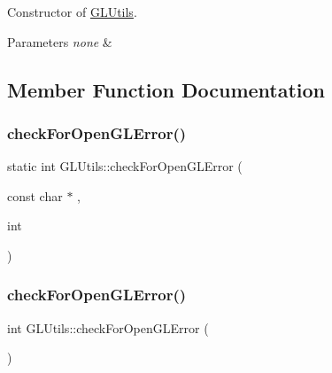 Constructor of \hyperlink{class_g_l_utils}{G\+L\+Utils}. 


\begin{DoxyParams}{Parameters}
{\em none} & \\
\hline
\end{DoxyParams}


\subsection{Member Function Documentation}
\hypertarget{class_g_l_utils_ae607a5d975a4e5f5ad12ca597fa6da6e}{}\label{class_g_l_utils_ae607a5d975a4e5f5ad12ca597fa6da6e} 
\subsubsection{\texorpdfstring{check\+For\+Open\+G\+L\+Error()}{checkForOpenGLError()}\hspace{0.1cm}{\footnotesize\ttfamily [1/2]}}
{\footnotesize\ttfamily static int G\+L\+Utils\+::check\+For\+Open\+G\+L\+Error (\begin{DoxyParamCaption}\item[{const char $\ast$}]{,  }\item[{int}]{ }\end{DoxyParamCaption})\hspace{0.3cm}{\ttfamily [static]}}

\hypertarget{class_g_l_utils_a6a512ab58f764da2a706f4d0ed6b060e}{}\label{class_g_l_utils_a6a512ab58f764da2a706f4d0ed6b060e} 
\subsubsection{\texorpdfstring{check\+For\+Open\+G\+L\+Error()}{checkForOpenGLError()}\hspace{0.1cm}{\footnotesize\ttfamily [2/2]}}
{\footnotesize\ttfamily int G\+L\+Utils\+::check\+For\+Open\+G\+L\+Error (\begin{DoxyParamCaption}{ }\end{DoxyParamCaption})\hspace{0.3cm}{\ttfamily [static]}}

